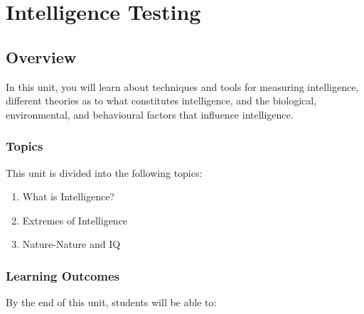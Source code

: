 \documentclass[
]{book}
\providecommand{\tightlist}{%
  \setlength{\itemsep}{0pt}\setlength{\parskip}{0pt}}
\begin{document}
\hypertarget{intelligence-testing}{%
\chapter{Intelligence Testing}\label{intelligence-testing}}

\hypertarget{overview-1}{%
\section*{Overview}\label{overview-1}}

In this unit, you will learn about techniques and tools for measuring intelligence, different theories as to what constitutes intelligence, and the biological, environmental, and behavioural factors that influence intelligence.

\hypertarget{topics-1}{%
\subsection*{Topics}\label{topics-1}}

This unit is divided into the following topics:

\begin{enumerate}
\def\labelenumi{\arabic{enumi}.}
\tightlist
\item
  What is Intelligence?\\
\item
  Extremes of Intelligence\\
\item
  Nature-Nature and IQ
\end{enumerate}

\hypertarget{learning-outcomes-1}{%
\subsection*{Learning Outcomes}\label{learning-outcomes-1}}

By the end of this unit, students will be able to:
\end{document}
